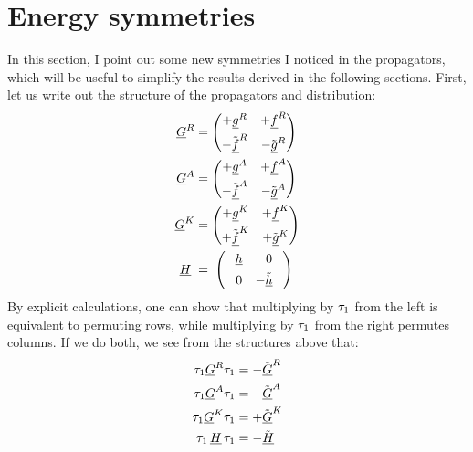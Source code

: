 
\clearpage
\section{Energy symmetries}
In this section, I point out some new symmetries I noticed in the propagators, which will be useful to simplify the results derived in the following sections.
First, let us write out the structure of the propagators and distribution:
\begin{align}
  \U{G}^R &= 
  \begin{pmatrix}
    +\U{g}^R  & +\U{f}^R  \\[1ex]
   -\TU{f}^R & -\TU{g}^R
  \end{pmatrix} \\
  \U{G}^A &= 
  \begin{pmatrix}
    +\U{g}^A  & +\U{f}^A  \\[1ex]
   -\TU{f}^A & -\TU{g}^A
  \end{pmatrix} \\
  \U{G}^K &= 
  \begin{pmatrix}
    +\U{g}^K  & +\U{f}^K  \\[1ex]
   +\TU{f}^K & +\TU{g}^K
  \end{pmatrix} \\
  \U{H} \;&= \;
  \begin{pmatrix}
    \PM\U{h}  & \PM0\PM  \\[1ex]
    \PM0      & -\TU{h}\PM
  \end{pmatrix}
\end{align}
By explicit calculations, one can show that multiplying by $\tau_{1}$ from the left is equivalent to permuting rows, while multiplying by $\tau_{1}$ from the right permutes columns.
If we do both, we see from the structures above that:
\begin{align}
  \tau_{1} \underline{G}^R \tau_{1}   &= -\tilde{\underline{G}}^R \\
  \tau_{1} \underline{G}^A \tau_{1}   &= -\tilde{\underline{G}}^A \\
  \tau_{1} \underline{G}^K \tau_{1}   &= +\tilde{\underline{G}}^K \\
  \tau_{1} \,\underline{H}\, \tau_{1} &= -\tilde{\underline{H}}
\end{align}
